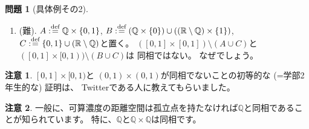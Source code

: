 \documentclass[uplatex]{jsarticle}
\theoremstyle{definition}
\newtheorem{prob}[prob]{問題}
\newtheorem*{rem*}{注意}
\newcommand{\dfn}{:\overset{\mbox{{\scriptsize def}}}{=}}
\newcommand{\R}{\mathbb{R}}
\newcommand{\Q}{\mathbb{Q}}
\begin{document}
\begin{prob}[具体例その2]
\begin{enumerate}
    \(([0,1)\times [0,1))\setminus ((\R\setminus \Q)\times \{0\})\)と
    \(((0,1)\times [0,1))\setminus ((\R\setminus \Q)\times \{0\})\)は
    どの二つも同相ではない。
    なぜでしょう。
    \item (難).
    \(A\dfn \Q\times \{0,1\}\),
    \(B\dfn (\Q\times \{0\}) \cup ((\R\setminus \Q) \times \{1\})\),
    \(C\dfn \{0,1\} \cup (\R\setminus \Q)\)と置く。
    \(([0,1]\times [0,1])\setminus (A\cup C)\)と
    \(([0,1]\times [0,1))\setminus (B\cup C)\)は
    同相ではない。
    なぜでしょう。
  \end{enumerate}
\end{prob}

\begin{rem*}
  \([0,1]\times [0,1)\)と
  \((0,1)\times (0,1)\)が同相でないことの初等的な (=学部2年生的な) 証明は、
  Twitterである人に教えてもらいました。
\end{rem*}


\begin{rem*}
  一般に、可算濃度の距離空間は孤立点を持たなければ\(\Q\)と同相であることが知られています。
  特に、\(\Q\)と\(\Q\times \Q\)は同相です。
\end{rem*}
\end{document}
